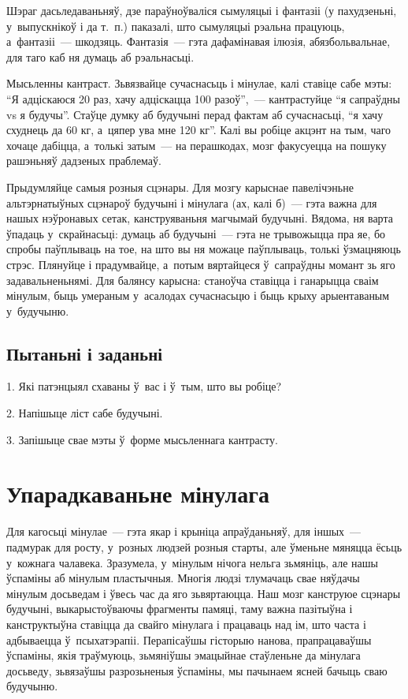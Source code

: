 Шэраг дасьледаваньняў, дзе параўноўваліся сымуляцыі і фантазіі (у пахудзеньні, у~выпускнікоў і да т.~п.) паказалі, што сымуляцыі рэальна працуюць, а~фантазіі~--- шкодзяць. Фантазія~--- гэта дафамінавая ілюзія, абязбольвальнае, для таго каб ня думаць аб рэальнасьці.

Мысьленны кантраст. Зьвязвайце сучаснасьць і мінулае, калі ставіце сабе мэты: ``Я адціскаюся 20 раз, хачу адціскацца 100 разоў'',~--- кантрастуйце ``я сапраўдны vs я будучы''. Стаўце думку аб будучыні перад фактам аб сучаснасьці, ``я хачу схуднець да 60 кг, а~цяпер ува мне 120 кг''. Калі вы робіце акцэнт на тым, чаго хочаце дабіцца, а~толькі затым~--- на перашкодах, мозг факусуецца на пошуку рашэньняў дадзеных праблемаў.

Прыдумляйце самыя розныя сцэнары. Для мозгу карыснае павелічэньне альтэрнатыўных сцэнароў будучыні і мінулага (ах, калі б)~--- гэта важна для нашых нэўронавых сетак, канструяваньня магчымай будучыні. Вядома, ня варта ўпадаць у~скрайнасьці: думаць аб будучыні~--- гэта не трывожыцца пра яе, бо спробы паўплываць на тое, на што вы ня можаце паўплываць, толькі ўзмацняюць стрэс. Плянуйце і прадумвайце, а~потым вяртайцеся ў~сапраўдны момант зь яго задавальненьнямі. Для балянсу карысна: станоўча ставіцца і ганарыцца сваім мінулым, быць умераным у~асалодах сучаснасьцю і быць крыху арыентаваным у~будучыню.

\subsection*{Пытаньні і заданьні}

1. Які патэнцыял схаваны ў~вас і ў~тым, што вы робіце?

2. Напішыце ліст сабе будучыні.

3. Запішыце свае мэты ў~форме мысьленнага кантрасту.


\section{Упарадкаваньне мінулага}

Для кагосьці мінулае~--- гэта якар і крыніца апраўданьняў, для іншых~--- падмурак для росту, у~розных людзей розныя старты, але ўменьне мяняцца ёсьць у~кожнага чалавека. Зразумела, у~мінулым нічога нельга зьмяніць, але нашы ўспаміны аб мінулым пластычныя. Многія людзі тлумачаць свае няўдачы мінулым досьведам і ўвесь час да яго зьвяртаюцца. Наш мозг канструюе сцэнары будучыні, выкарыстоўваючы фрагменты памяці, таму важна пазітыўна і канструктыўна ставіцца да свайго мінулага і працаваць над ім, што часта і адбываецца ў~псыхатэрапіі. Перапісаўшы гісторыю нанова, прапрацаваўшы ўспаміны, якія траўмуюць, зьмяніўшы эмацыйнае стаўленьне да мінулага досьведу, зьвязаўшы разрозьненыя ўспаміны, мы пачынаем ясней бачыць сваю будучыню.

